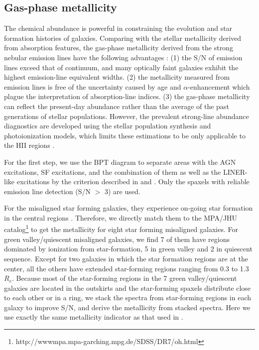 \documentclass[a4paper,fleqn,usenatbib]{mnras}
\begin{document}
\subsection{Gas-phase metallicity}\label{sec: gas-metal}

The chemical abundance is powerful in constraining the evolution and star formation histories of galaxies. Comparing with the stellar metallicity derived from absorption features, the gas-phase metallicity derived from the strong nebular emission lines have the following advantages \citep{Tremonti-04}: (1) the S/N of emission lines exceed that of continuum, and many optically faint galaxies exhibit the highest emission-line equivalent widths. (2) the metallicity measured from emission lines is free of the uncertainty caused by age and $\alpha$-enhancement which plague the interpretation of absorption-line indices. (3) the gas-phase metallicity can reflect the present-day abundance rather than the average of the past generations of stellar populations.
However, the prevalent strong-line abundance diagnostics are developed using the stellar population synthesis and photoionization models, which limits these estimations to be only applicable to the HII regions \citep{kewley-2002}. 

For the first step, we use the BPT diagram \citep{bpt-1981} to separate areas with the AGN excitations, SF excitations, and the combination of them as well as the LINER-like excitations by the criterion described in \cite{kewley-2001} and \cite{kauffmann-2003c}. Only the spaxels with reliable emission line detection (S/N $>$ 3) are used.

For the misaligned star forming galaxies, they experience on-going star formation in the central regions \citep{chen-prep}. Therefore, we directly match them to the MPA/JHU catalog\footnote{http://wwwmpa.mpa-garching.mpg.de/SDSS/DR7/oh.html} to get the metallicity \citep{Tremonti-04} for eight star forming misaligned galaxies.
For green valley/quiescent misaligned galaxies, we find 7 of them have regions dominated by ionization from star-formation, 5 in green valley and 2 in quiescent sequence. Except for two galaxies in which the star formation regions are at the center, all the others have extended star-forming regions ranging from 0.3 to 1.3 $R_e$. 
Because most of the star-forming regions in the 7 green valley/quiescent galaxies are located in the outskirts and the star-forming spaxels distribute close to each other or in a ring, we stack the spectra from star-forming regions in each galaxy to improve S/N, and derive the metallicity from stacked spectra.
Here we use exactly the same metallicity indicator as that used in \cite{Tremonti-04}. 
\end{document}
